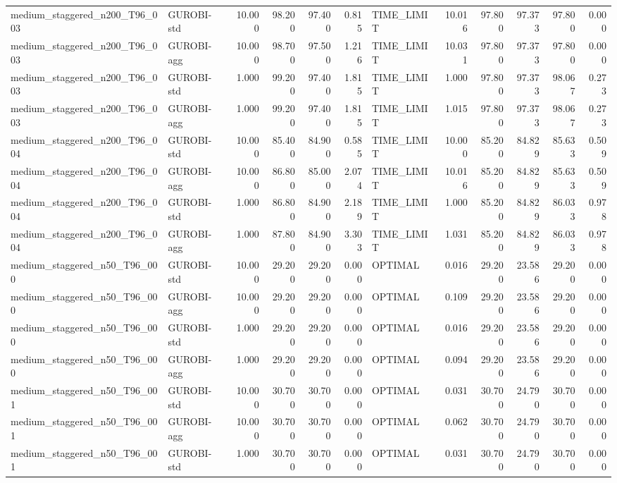\begin{table}[htbp]
\begin{tabular}{llrrrrlrrrrr}
medium\_staggered\_n200\_T96\_003 & GUROBI-std & 10.000 & 98.200 & 97.400 & 0.815 & TIME\_LIMIT & 10.016 & 97.800 & 97.373 & 97.800 & 0.000 \\
medium\_staggered\_n200\_T96\_003 & GUROBI-agg & 10.000 & 98.700 & 97.500 & 1.216 & TIME\_LIMIT & 10.031 & 97.800 & 97.373 & 97.800 & 0.000 \\
medium\_staggered\_n200\_T96\_003 & GUROBI-std & 1.000 & 99.200 & 97.400 & 1.815 & TIME\_LIMIT & 1.000 & 97.800 & 97.373 & 98.067 & 0.273 \\
medium\_staggered\_n200\_T96\_003 & GUROBI-agg & 1.000 & 99.200 & 97.400 & 1.815 & TIME\_LIMIT & 1.015 & 97.800 & 97.373 & 98.067 & 0.273 \\
medium\_staggered\_n200\_T96\_004 & GUROBI-std & 10.000 & 85.400 & 84.900 & 0.585 & TIME\_LIMIT & 10.000 & 85.200 & 84.829 & 85.633 & 0.509 \\
medium\_staggered\_n200\_T96\_004 & GUROBI-agg & 10.000 & 86.800 & 85.000 & 2.074 & TIME\_LIMIT & 10.016 & 85.200 & 84.829 & 85.633 & 0.509 \\
medium\_staggered\_n200\_T96\_004 & GUROBI-std & 1.000 & 86.800 & 84.900 & 2.189 & TIME\_LIMIT & 1.000 & 85.200 & 84.829 & 86.033 & 0.978 \\
medium\_staggered\_n200\_T96\_004 & GUROBI-agg & 1.000 & 87.800 & 84.900 & 3.303 & TIME\_LIMIT & 1.031 & 85.200 & 84.829 & 86.033 & 0.978 \\
medium\_staggered\_n50\_T96\_000 & GUROBI-std & 10.000 & 29.200 & 29.200 & 0.000 & OPTIMAL & 0.016 & 29.200 & 23.586 & 29.200 & 0.000 \\
medium\_staggered\_n50\_T96\_000 & GUROBI-agg & 10.000 & 29.200 & 29.200 & 0.000 & OPTIMAL & 0.109 & 29.200 & 23.586 & 29.200 & 0.000 \\
medium\_staggered\_n50\_T96\_000 & GUROBI-std & 1.000 & 29.200 & 29.200 & 0.000 & OPTIMAL & 0.016 & 29.200 & 23.586 & 29.200 & 0.000 \\
medium\_staggered\_n50\_T96\_000 & GUROBI-agg & 1.000 & 29.200 & 29.200 & 0.000 & OPTIMAL & 0.094 & 29.200 & 23.586 & 29.200 & 0.000 \\
medium\_staggered\_n50\_T96\_001 & GUROBI-std & 10.000 & 30.700 & 30.700 & 0.000 & OPTIMAL & 0.031 & 30.700 & 24.790 & 30.700 & 0.000 \\
medium\_staggered\_n50\_T96\_001 & GUROBI-agg & 10.000 & 30.700 & 30.700 & 0.000 & OPTIMAL & 0.062 & 30.700 & 24.790 & 30.700 & 0.000 \\
medium\_staggered\_n50\_T96\_001 & GUROBI-std & 1.000 & 30.700 & 30.700 & 0.000 & OPTIMAL & 0.031 & 30.700 & 24.790 & 30.700 & 0.000 \\

\end{tabular}
\end{table}
